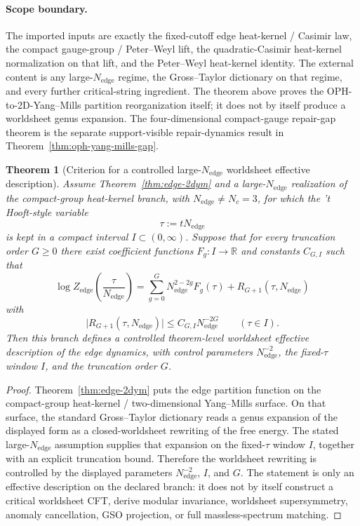 \documentclass[11pt]{article}
\newtheorem{theorem}{Theorem}[section]
\begin{document}
\paragraph{Scope boundary.}
The imported inputs are exactly the fixed-cutoff edge heat-kernel / Casimir law, the compact
gauge-group / Peter--Weyl lift, the quadratic-Casimir heat-kernel normalization on that lift, and
the Peter--Weyl heat-kernel identity. The external content is any large-\(N_{\mathrm{edge}}\)
regime, the Gross--Taylor dictionary on that regime, and every further critical-string
ingredient. The theorem above proves the OPH-to-2D-Yang--Mills partition reorganization itself; it
does not by itself produce a worldsheet genus expansion. The four-dimensional compact-gauge
repair-gap theorem is the separate support-visible repair-dynamics result in
Theorem~\ref{thm:oph-yang-mills-gap}.

\begin{theorem}[Criterion for a controlled large-$N_{\mathrm{edge}}$ worldsheet effective description]\label{thm:worldsheet-largeN}
Assume Theorem~\ref{thm:edge-2dym} and a large-$N_{\mathrm{edge}}$
realization of the compact-group heat-kernel branch, with \(N_{\mathrm{edge}}\neq N_c=3\), for
which the 't Hooft-style variable
\[
\tau:=tN_{\mathrm{edge}}
\]
is kept in a compact interval \(I\subset (0,\infty)\). Suppose that for every truncation
order \(G\ge 0\) there exist coefficient functions \(F_g:I\to\mathbb R\) and constants
\(C_{G,I}\) such that
\[
\log Z_{\mathrm{edge}}\!\left(\frac{\tau}{N_{\mathrm{edge}}}\right)
=
\sum_{g=0}^{G} N_{\mathrm{edge}}^{2-2g} F_g(\tau)
+
R_{G+1}(\tau,N_{\mathrm{edge}})
\]
with
\[
\bigl|R_{G+1}(\tau,N_{\mathrm{edge}})\bigr|
\le
C_{G,I}N_{\mathrm{edge}}^{-2G}
\qquad(\tau\in I).
\]
Then this branch defines a controlled theorem-level worldsheet effective description of the edge
dynamics, with control parameters \(N_{\mathrm{edge}}^{-2}\), the fixed-\(\tau\) window \(I\),
and the truncation order \(G\).
\end{theorem}

\begin{proof}
Theorem~\ref{thm:edge-2dym} puts the edge partition function on the compact-group heat-kernel /
two-dimensional Yang--Mills surface. On that surface, the standard Gross--Taylor dictionary reads
a genus expansion of the displayed form as a closed-worldsheet rewriting of the free energy. The
stated large-\(N_{\mathrm{edge}}\) assumption supplies that expansion on the fixed-\(\tau\) window
\(I\), together with an explicit truncation bound. Therefore the worldsheet rewriting is
controlled by the displayed parameters \(N_{\mathrm{edge}}^{-2}\), \(I\), and \(G\). The
statement is only an effective description on the declared branch: it does not by itself construct
a critical worldsheet CFT, derive modular invariance, worldsheet supersymmetry, anomaly
cancellation, GSO projection, or full massless-spectrum matching.
\end{proof}
\end{document}
